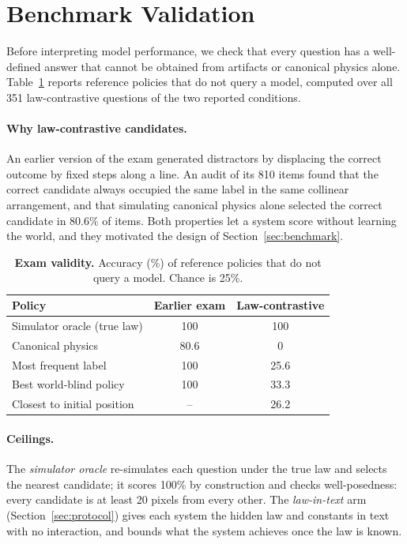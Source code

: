 \section{Benchmark Validation}
\label{sec:validation}

Before interpreting model performance, we check that every question has a well-defined answer that cannot be obtained from artifacts or canonical physics alone. Table~\ref{tab:validation} reports reference policies that do not query a model, computed over all 351 law-contrastive questions of the two reported conditions.

\paragraph{Why law-contrastive candidates.} An earlier version of the exam generated distractors by displacing the correct outcome by fixed steps along a line. An audit of its 810 items found that the correct candidate always occupied the same label in the same collinear arrangement, and that simulating canonical physics alone selected the correct candidate in 80.6\% of items. Both properties let a system score without learning the world, and they motivated the design of Section~\ref{sec:benchmark}.

\begin{table}[t]
  \centering
  \caption{\textbf{Exam validity.} Accuracy (\%) of reference policies that do not query a model. Chance is 25\%.}
  \label{tab:validation}
  \small
  \begin{tabular}{lcc}
    \toprule
    Policy & Earlier exam & Law-contrastive \\
    \midrule
    Simulator oracle (true law)   & 100 & 100 \\
    Canonical physics             & 80.6 & 0 \\
    Most frequent label           & 100 & 25.6 \\
    Best world-blind policy       & 100 & 33.3 \\
    Closest to initial position   & --  & 26.2 \\
    \bottomrule
  \end{tabular}
\end{table}

\paragraph{Ceilings.} The \emph{simulator oracle} re-simulates each question under the true law and selects the nearest candidate; it scores 100\% by construction and checks well-posedness: every candidate is at least 20 pixels from every other. The \emph{law-in-text} arm (Section~\ref{sec:protocol}) gives each system the hidden law and constants in text with no interaction, and bounds what the system achieves once the law is known.

